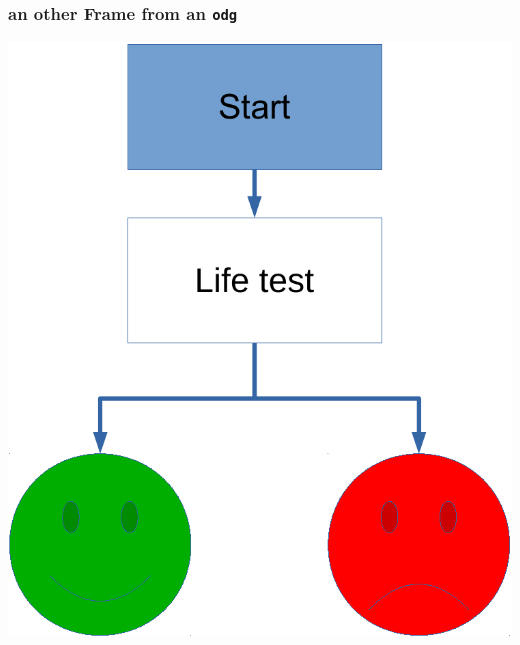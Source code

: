\documentclass{beamer}
\begin{document}
\begin{frame}
\frametitle{an other Frame from an \texttt{odg}}

\begin{center}
   \includegraphics[height=.8\textheight,width=\textwidth,keepaspectratio]{diag}
\end{center}

\end{frame}
\end{document}
